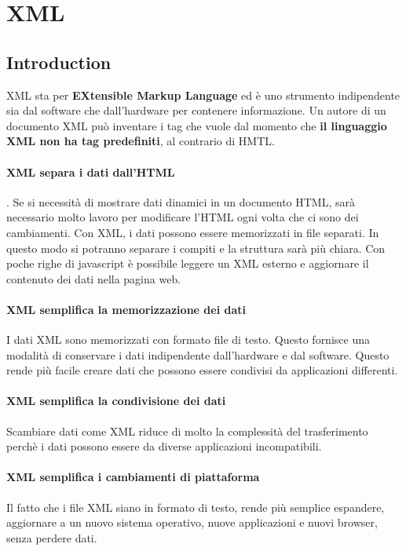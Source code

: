 
\chapter{XML}
\section{Introduction}
XML sta per \textbf{EXtensible Markup Language} ed è uno strumento indipendente sia dal software che dall'hardware per contenere informazione. 
Un autore di un documento XML può inventare i tag che vuole dal momento che \textbf{il linguaggio XML non ha tag predefiniti}, al contrario di HMTL.\\

\subsubsection{XML separa i dati dall'HTML}. 
Se si necessità di mostrare dati dinamici in un documento HTML, sarà necessario molto lavoro per modificare l'HTML ogni volta che ci sono dei cambiamenti. Con XML, i dati possono essere memorizzati in file separati. In questo modo si potranno separare i compiti e la struttura sarà più chiara. Con poche righe di javascript è possibile leggere un XML esterno e aggiornare il contenuto dei dati nella pagina web. 

\subsubsection{XML semplifica la memorizzazione dei dati}
I dati XML sono memorizzati con formato file di testo. Questo fornisce una modalità di conservare i dati indipendente dall'hardware e dal software. Questo rende più facile creare dati che possono essere condivisi da applicazioni differenti.

\subsubsection{XML semplifica la condivisione dei dati}
Scambiare dati come XML riduce di molto la complessità del trasferimento perchè i dati possono essere da diverse applicazioni incompatibili.

\subsubsection{XML semplifica i cambiamenti di piattaforma}
Il fatto che i file XML siano in formato di testo, rende più semplice espandere, aggiornare a un nuovo sistema operativo, nuove applicazioni e nuovi browser, senza perdere dati.

